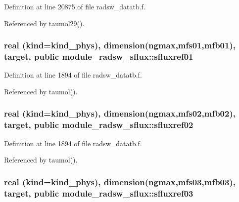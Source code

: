 Definition at line 20875 of file radsw\+\_\+datatb.\+f.



Referenced by taumol29().

\subsubsection[{\texorpdfstring{sfluxref01}{sfluxref01}}]{\setlength{\rightskip}{0pt plus 5cm}real (kind=kind\+\_\+phys), dimension(ngmax,mfs01,mfb01), target, public module\+\_\+radsw\+\_\+sflux\+::sfluxref01}\hypertarget{group__module__radsw__main_ga84205f359fb3e1a0e1d03e755c52dc78}{}\label{group__module__radsw__main_ga84205f359fb3e1a0e1d03e755c52dc78}


Definition at line 1894 of file radsw\+\_\+datatb.\+f.



Referenced by taumol().

\subsubsection[{\texorpdfstring{sfluxref02}{sfluxref02}}]{\setlength{\rightskip}{0pt plus 5cm}real (kind=kind\+\_\+phys), dimension(ngmax,mfs02,mfb02), target, public module\+\_\+radsw\+\_\+sflux\+::sfluxref02}\hypertarget{group__module__radsw__main_gaa57fca862289bd57327b9c3ef27e3e2f}{}\label{group__module__radsw__main_gaa57fca862289bd57327b9c3ef27e3e2f}


Definition at line 1894 of file radsw\+\_\+datatb.\+f.



Referenced by taumol().

\subsubsection[{\texorpdfstring{sfluxref03}{sfluxref03}}]{\setlength{\rightskip}{0pt plus 5cm}real (kind=kind\+\_\+phys), dimension(ngmax,mfs03,mfb03), target, public module\+\_\+radsw\+\_\+sflux\+::sfluxref03}\hypertarget{group__module__radsw__main_ga95d2640cf0e6cf0ba4a8ca1758806e48}{}\label{group__module__radsw__main_ga95d2640cf0e6cf0ba4a8ca1758806e48}


